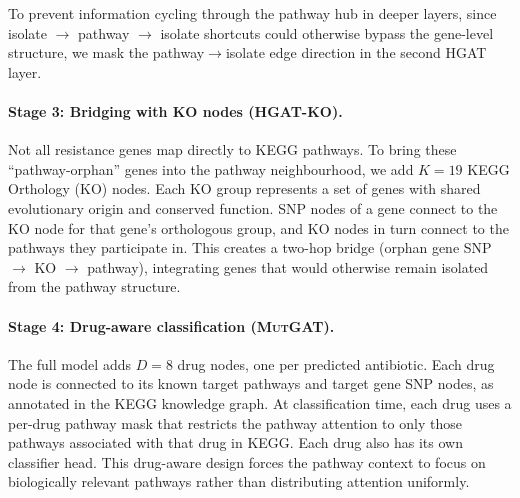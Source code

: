 \documentclass{article}
\theoremstyle{plain}
\theoremstyle{definition}
\theoremstyle{remark}
\begin{document}
To prevent information cycling through the pathway hub in deeper layers, since isolate $\to$ pathway $\to$ isolate shortcuts could otherwise bypass the gene-level structure, we mask the pathway$\to$isolate edge direction in the second HGAT layer.

\paragraph{Stage 3: Bridging with KO nodes (\textsc{HGAT-KO}).}
Not all resistance genes map directly to KEGG pathways. To bring these ``pathway-orphan'' genes into the pathway neighbourhood, we add $K = 19$ KEGG Orthology (KO) nodes. Each KO group represents a set of genes with shared evolutionary origin and conserved function. SNP nodes of a gene connect to the KO node for that gene's orthologous group, and KO nodes in turn connect to the pathways they participate in. This creates a two-hop bridge (orphan gene SNP $\to$ KO $\to$ pathway), integrating genes that would otherwise remain isolated from the pathway structure.

\paragraph{Stage 4: Drug-aware classification (\textsc{MutGAT}).}
The full model adds $D = 8$ drug nodes, one per predicted antibiotic. Each drug node is connected to its known target pathways and target gene SNP nodes, as annotated in the KEGG knowledge graph. At classification time, each drug uses a per-drug pathway mask that restricts the pathway attention to only those pathways associated with that drug in KEGG. Each drug also has its own classifier head. This drug-aware design forces the pathway context to focus on biologically relevant pathways rather than distributing attention uniformly.
\end{document}
